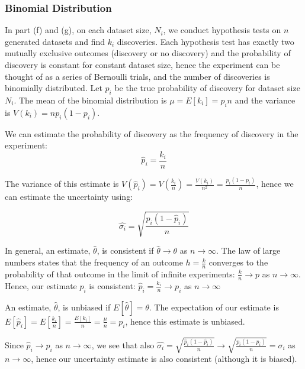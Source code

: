 \documentclass{article}
\begin{document}
\subsubsection*{Binomial Distribution}

In part (f) and (g), on each dataset size, $N_i$, we conduct hypothesis tests on $n$ generated datasets and find $k_i$ discoveries. Each hypothesis test has exactly two mutually exclusive outcomes (discovery or no discovery) and the probability of discovery is constant for constant dataset size, hence the experiment can be thought of as a series of Bernoulli trials, and the number of discoveries is binomially distributed. Let $p_i$ be the true probability of discovery for dataset size $N_i$. The mean of the binomial distribution is $\mu = E[k_i] = p_in$ and the variance is $V(k_i) = np_i(1-p_i)$.

We can estimate the probability of discovery as the frequency of discovery in the experiment:
\begin{equation}
\hat{p}_i = \frac{k_i}{n}
\label{eq:prob_est}
\end{equation}

The variance of this estimate is $V(\hat{p}_i) = V(\frac{k_i}{n}) = \frac{V(k_i)}{n^2} = \frac{p_i(1-p_i)}{n}$, hence we can estimate the uncertainty using:

\begin{equation}
\hat{\sigma_i} = \sqrt{\frac{\hat{p}_i(1-\hat{p}_i)}{n}}
\label{eq:sig_est}
\end{equation}

In general, an estimate, $\hat{\theta}$, is consistent if $\hat{\theta} \to \theta$ as $n \to \infty$. The law of large numbers states that the frequency of an outcome $h = \frac{k}{n}$ converges to the probability of that outcome in the limit of infinite experiments: $\frac{k}{n} \to p$ as $n \to \infty$. Hence, our estimate $\hat{p}_i$ is consistent: $\hat{p}_i = \frac{k_i}{n} \to p_i$ as $n \to \infty$

An estimate, $\hat{\theta}$, is unbiased if $E[\hat{\theta}] = \theta$. The expectation of our estimate is $E[\hat{p}_i] = E[\frac{k_i}{n}] = \frac{E[k_i]}{n} = \frac{\mu}{n} = p_i$, hence this estimate is unbiased.

Since $\hat{p}_i \to p_i$ as $n \to \infty$, we see that also $\hat{\sigma_i} = \sqrt{\frac{\hat{p}_i(1-\hat{p}_i)}{n}} \to \sqrt{\frac{p_i(1-p_i)}{n}} = \sigma_i$ as $n \to \infty$, hence our uncertainty estimate is also consistent (although it is biased).
\end{document}

